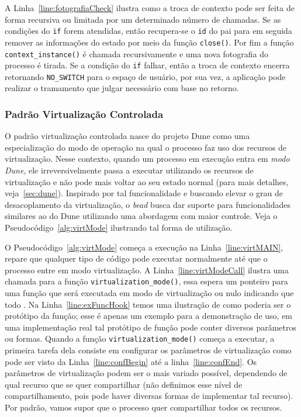 A Linha~\ref{line:fotografiaCheck} ilustra como a troca de contexto pode ser
feita de forma recursiva ou limitada por um determinado número de chamadas. Se
as condições do \texttt{if} forem atendidas, então recupera-se o \texttt{id} do
pai para em seguida remover as informações do estado por meio da função
\texttt{close()}. Por fim a função \texttt{context\_instance()} é chamada
recursivamente e uma nova fotografia do processo é tirada. Se a condição do
\texttt{if} falhar, então a troca de contexto encerra retornando
\texttt{NO\_SWITCH} para o espaço de usuário, por sua vez, a aplicação pode
realizar o tramamento que julgar necessário com base no retorno.

\subsubsection{Padrão Virtualização Controlada}

O padrão virtualização controlada nasce do projeto Dune como uma especialização
do modo de operação na qual o processo faz uso dos recursos de virtualização.
Nesse contexto, quando um processo em execução entra em \emph{modo Dune}, ele
irreversivelmente passa a executar utilizando os recursos de virtualização e
não pode mais voltar ao seu estado normal (para mais detalhes,
veja~\ref{sec:dune}). Inspirado por tal funcionalidade e buscando elevar o grau
de desacoplamento da virtualização, o \emph{bead} busca dar suporte para
funcionalidades similares ao do Dune utilizando uma abordagem com maior
controle. Veja o Pseudocódigo~\ref{alg:virtMode} ilustrando tal forma de
utilização.



O Pseudocódigo~\ref{alg:virtMode} começa a execução na Linha~\ref{line:virtMAIN}, repare que qualquer tipo de código pode executar normalmente até que o processo entre em modo virtualização. A Linha~\ref{line:virtModeCall} ilustra uma chamada para a função \texttt{virtualization\_mode()}, essa espera um ponteiro para uma função que será executada em modo de virtualização ou nulo indicando que todo . Na Linha~\ref{line:exFuncHook} temos uma ilustração de como poderia ser o protótipo da função; esse é apenas um exemplo para a demonstração de uso, em uma implementação real tal protótipo de função pode conter diversos parâmetros ou formas. Quando a função \texttt{virtualization\_mode()} começa a executar, a primeira tarefa dela consiste em configurar os parâmetros de virtualização como pode ser visto da Linha~\ref{line:confBegin} até a linha~\ref{line:confEnd}. Os parâmetros de virtualização podem ser o mais variado possível, dependendo de qual recurso que se quer compartilhar (não definimos esse nível de compartilhamento, pois pode haver diversas formas de implementar tal recurso). Por padrão, vamos supor que o processo quer compartilhar todos os recursos.

